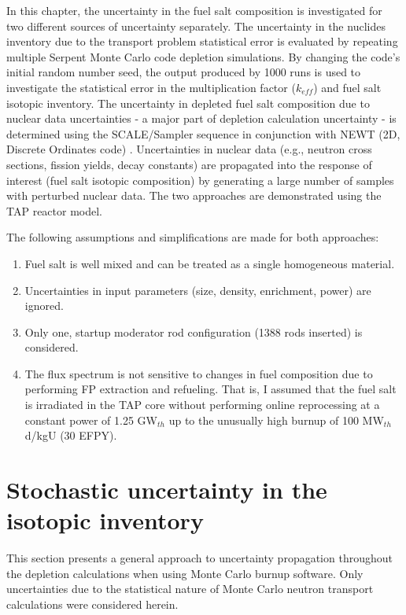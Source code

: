 In this chapter, the uncertainty in the fuel salt composition is investigated 
for two different sources of uncertainty separately. The uncertainty in the 
nuclides inventory due to the transport problem statistical error is evaluated 
by repeating multiple Serpent Monte Carlo code depletion simulations. By 
changing the code's initial random number seed, the output produced by 1000 
runs is used to investigate the statistical error in the multiplication factor 
($k_{eff}$) and fuel salt isotopic inventory. The uncertainty in depleted fuel 
salt composition due to nuclear data uncertainties - a major part of depletion 
calculation uncertainty - is determined using the SCALE/Sampler sequence in 
conjunction with NEWT (2D, Discrete Ordinates code) \cite{rearden_scale_2018}. 
Uncertainties in nuclear data (e.g., neutron cross sections, fission yields, 
decay constants) are propagated into the response of interest (fuel salt 
isotopic composition) by generating a large number of samples with perturbed 
nuclear data. The two approaches are demonstrated using the \gls{TAP} reactor 
model.

The following assumptions and simplifications are made for both approaches:
\begin{enumerate}[label=(\alph*), noitemsep, topsep=0pt]
	\item Fuel salt is well mixed and can be treated as a single homogeneous 
	material.
	\item Uncertainties in input parameters (size, density, enrichment, power) 
	are ignored.
	\item Only one, startup moderator rod configuration (1388 rods inserted) 
	is considered.
	\item The flux spectrum is not sensitive to changes in fuel composition 
	due to performing \gls{FP} extraction and refueling. That is, I assumed 
	that the fuel salt is irradiated in the \gls{TAP} core without performing  
	online reprocessing at a constant power of 1.25 GW$_{th}$ up to the 
	unusually high burnup of 100 MW$_{th}$d/kgU (30 EFPY).
\end{enumerate}


\section{Stochastic uncertainty in the isotopic inventory} 
\label{sec:uq-stochastic}
This section presents a general approach to uncertainty propagation throughout 
the depletion calculations when using Monte Carlo burnup software. Only 
uncertainties due to the statistical nature of Monte Carlo neutron transport 
calculations were considered herein. 

